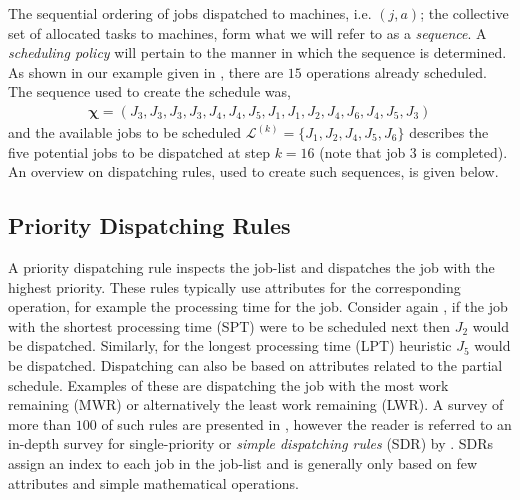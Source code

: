 \documentclass[smallextended]{svjour3}
\renewcommand{\vchi}{\bm \chi}
\begin{document}
	
The sequential ordering of jobs dispatched to machines, i.e. $(j,a)$; the collective set of
allocated tasks to machines, form what we will refer to as a \emph{sequence}. A \emph{scheduling policy} will
pertain to the manner in which the sequence is determined.  As shown
in our example given in , there are $15$
operations already scheduled. The sequence used to create the schedule
was,
\begin{eqnarray}
  \vchi=\left(J_3,J_3,J_3,J_3,J_4,J_4,J_5,J_1,J_1,J_2,J_4,J_6,J_4,J_5,J_3\right)
\end{eqnarray}
and the available jobs to be scheduled
$\mathcal{L}^{(k)}=\{J_1,J_2,J_4,J_5,J_6\}$ describes the five potential jobs to be dispatched
at step $k=16$ (note that job 3 is completed). An overview on dispatching rules, used to create such sequences, is given below.
	
\subsection{Priority Dispatching Rules}
	
	
A priority dispatching rule  inspects the job-list
 and dispatches the job with the highest priority. These
rules typically use attributes for the corresponding operation, for example the 
processing time for the job. Consider again , if the
job with the shortest processing time (SPT) were to be scheduled next
then $J_2$ would be dispatched. Similarly, for the longest processing
time (LPT) heuristic $J_5$ would be dispatched. Dispatching can
also be based on attributes related to the partial schedule. Examples of these are 
dispatching the job with the most work remaining (MWR) or alternatively the least work remaining
(LWR). A survey of more than
$100$ of such rules are presented in \citet{Panwalkar77}, however the
reader is referred to an in-depth survey for single-priority or
\emph{simple dispatching rules} (SDR) by \citet{Haupt89}.  SDRs assign
an index to each job in the job-list and
is generally only based on few attributes and simple mathematical
operations.
\end{document}
